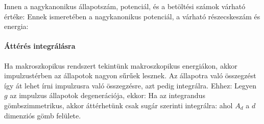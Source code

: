    Innen a nagykanonikus állapotszám, potenciál, és a betöltési számok várható értéke:
   Ennek ismeretében a nagykanonikus potenciál, a várható részecskeszám és energia:
   
   \paragraph{Áttérés integrálásra}
    
    Ha makroszkopikus rendszert tekintünk makroszkopikus energiákon, akkor impulzustérben az állapotok nagyon sűrűek lesznek. Az állapotra való összegzést így át lehet írni impulzusra való összegzésre, azt pedig integrálra. Ehhez:
    Legyen $g$ az impulzus állapotok degenerációja, ekkor:
    Ha az integrandus gömbszimmetrikus, akkor áttérhetünk csak sugár szerinti integrálra:
    ahol $A_d$ a $d$ dimenziós gömb felülete.
    
